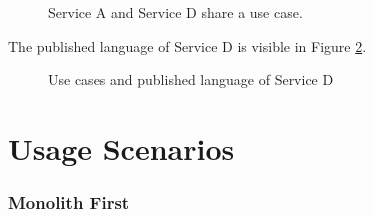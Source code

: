 \begin{figure}[H]
	\caption{Service A and Service D share a use case.}
	\label{fig:service-dependency}
\end{figure}

The published language of Service D is visible in Figure \ref{fig:service-publang}.

\begin{figure}[H]
	\caption{Use cases and published language of Service D}
	\label{fig:service-publang}
\end{figure}

\section{Usage Scenarios}

\subsubsection{Monolith First}

